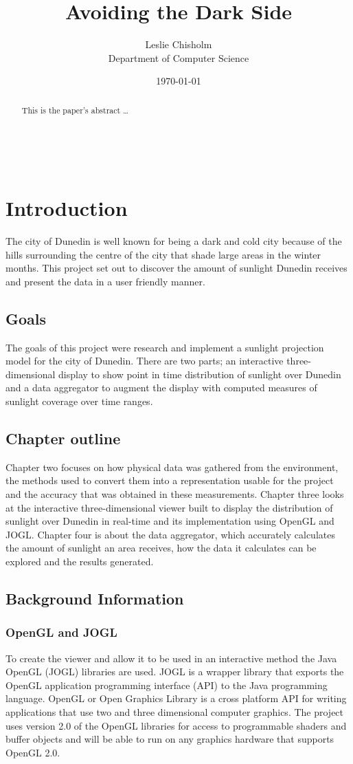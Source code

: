 \documentclass[12pt]{report}
\title{Avoiding the Dark Side}
\author{
        Leslie Chisholm \\
                Department of Computer Science\\
}
\date{\today}
\begin{document}
\maketitle

\begin{abstract}
This is the paper's abstract \ldots
\end{abstract}

\tableofcontents
\listoffigures\
\listofalgorithms
\chapter{Introduction}
The city of Dunedin is well known for being a dark and cold city because of the hills surrounding the centre of the city that shade large areas in the winter months. This project set out to discover the amount of sunlight Dunedin receives and present the data in a user friendly manner.

\section{Goals}
The goals of this project were research and implement a sunlight projection model for the city of Dunedin. There are two parts; an interactive three-dimensional display to show point in time distribution of sunlight over Dunedin and a data aggregator to augment the display with computed measures of sunlight coverage over time ranges.

\section{Chapter outline}
Chapter two focuses on how physical data was gathered from the environment, the methods used to convert them into a representation usable for the project and the accuracy that was obtained in these measurements. Chapter three looks at the interactive three-dimensional viewer built to display the distribution of sunlight over Dunedin in real-time and its implementation using OpenGL and JOGL. Chapter four is about the data aggregator, which accurately calculates the amount of sunlight an area receives, how the data it calculates can be explored and the results generated.

\section{Background Information}
\subsection{OpenGL and JOGL} 
To create the viewer and allow it to be used in an interactive method the Java OpenGL (JOGL)\cite{JOGL} libraries are used. JOGL is a wrapper library that exports the OpenGL application programming interface (API) to the Java programming language. OpenGL or Open Graphics Library is a cross platform API for writing applications that use two and three dimensional computer graphics. The project uses version 2.0 of the OpenGL libraries for access to programmable shaders and buffer objects and will be able to run on any graphics hardware that supports OpenGL 2.0.
\end{document}
